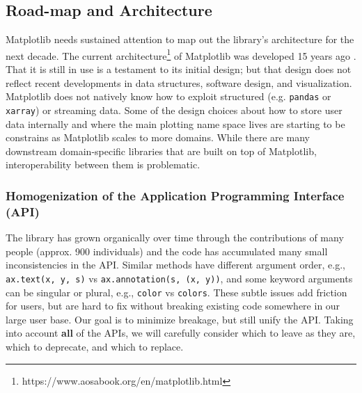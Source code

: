 \documentclass[11pt]{article}  %
\begin{document}

\subsection{Road-map and Architecture }

Matplotlib needs sustained attention to map out the library's architecture for the next decade.  The current
architecture\footnote{https://www.aosabook.org/en/matplotlib.html} of
Matplotlib was developed 15 years ago \cite{Hunter:2007}.  That it is
still in use is a testament to its initial design; but that design
does not reflect recent developments in data structures, software
design, and visualization.  Matplotlib does not natively know how to
exploit structured (e.g. \texttt{pandas} or \texttt{xarray}) or
streaming data.  Some of the design choices about how to store user
data internally and where the main plotting name space lives are
starting to be constrains as Matplotlib scales to more domains.  While
there are many downstream domain-specific libraries that are built on
top of Matplotlib, interoperability between them is problematic.


\subsubsection{Homogenization of the Application Programming Interface (API)}

The library has grown organically over time through the contributions
of many people (approx. 900 individuals) and the code has accumulated
many small inconsistencies in the API.  Similar methods have different
argument order, e.g., \texttt{ax.text(x, y, s)} vs
\texttt{ax.annotation(s, (x, y))}, and some keyword arguments can be
singular or plural, e.g., \texttt{color} vs \texttt{colors}.  These
subtle issues add friction for users, but are hard to fix without
breaking existing code somewhere in our large user base.  Our goal is
to minimize breakage, but still unify the API.  Taking into account
\textbf{all} of the APIs, we will carefully consider which to leave as
they are, which to deprecate, and which to replace.
\end{document}
